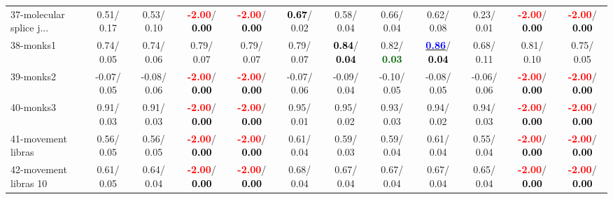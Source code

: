 \begin{table}[h]
\begin{center}
{\begin{tabular}{lc|c|c|c|c|c|c|c|c|c|c}
37-molecular splice j... &   0.51/  0.17 &   0.53/  0.10 & \textcolor{red}{\textbf{ -2.00}}/\textcolor{black}{\textbf{  0.00}} & \textcolor{red}{\textbf{ -2.00}}/\textcolor{black}{\textbf{  0.00}} & \textcolor{black}{\textbf{  0.67}}/  0.02 &   0.58/  0.04 &   0.66/  0.04 &   0.62/  0.08 &   0.23/  0.01 & \textcolor{red}{\textbf{ -2.00}}/\textcolor{black}{\textbf{  0.00}} & \textcolor{red}{\textbf{ -2.00}}/\textcolor{black}{\textbf{  0.00}} \\
38-monks1 &   0.74/  0.05 &   0.74/  0.06 &   0.79/  0.07 &   0.79/  0.07 &   0.79/  0.07 & \textcolor{black}{\textbf{  0.84}}/\textcolor{black}{\textbf{  0.04}} &   0.82/\textcolor{darkgreen}{\textbf{  0.03}} & \underline{\textcolor{blue}{\textbf{  0.86}}}/\textcolor{black}{\textbf{  0.04}} &   0.68/  0.11 &   0.81/  0.10 &   0.75/  0.05 \\
39-monks2 &  -0.07/  0.05 &  -0.08/  0.06 & \textcolor{red}{\textbf{ -2.00}}/\textcolor{black}{\textbf{  0.00}} & \textcolor{red}{\textbf{ -2.00}}/\textcolor{black}{\textbf{  0.00}} &  -0.07/  0.06 &  -0.09/  0.04 &  -0.10/  0.05 &  -0.08/  0.05 &  -0.06/  0.06 & \textcolor{red}{\textbf{ -2.00}}/\textcolor{black}{\textbf{  0.00}} & \textcolor{red}{\textbf{ -2.00}}/\textcolor{black}{\textbf{  0.00}} \\ \hline
40-monks3 &   0.91/  0.03 &   0.91/  0.03 & \textcolor{red}{\textbf{ -2.00}}/\textcolor{black}{\textbf{  0.00}} & \textcolor{red}{\textbf{ -2.00}}/\textcolor{black}{\textbf{  0.00}} &   0.95/  0.01 &   0.95/  0.02 &   0.93/  0.03 &   0.94/  0.02 &   0.94/  0.03 & \textcolor{red}{\textbf{ -2.00}}/\textcolor{black}{\textbf{  0.00}} & \textcolor{red}{\textbf{ -2.00}}/\textcolor{black}{\textbf{  0.00}} \\
41-movement libras &   0.56/  0.05 &   0.56/  0.05 & \textcolor{red}{\textbf{ -2.00}}/\textcolor{black}{\textbf{  0.00}} & \textcolor{red}{\textbf{ -2.00}}/\textcolor{black}{\textbf{  0.00}} &   0.61/  0.04 &   0.59/  0.03 &   0.59/  0.04 &   0.61/  0.04 &   0.55/  0.04 & \textcolor{red}{\textbf{ -2.00}}/\textcolor{black}{\textbf{  0.00}} & \textcolor{red}{\textbf{ -2.00}}/\textcolor{black}{\textbf{  0.00}} \\
42-movement libras 10 &   0.61/  0.05 &   0.64/  0.04 & \textcolor{red}{\textbf{ -2.00}}/\textcolor{black}{\textbf{  0.00}} & \textcolor{red}{\textbf{ -2.00}}/\textcolor{black}{\textbf{  0.00}} &   0.68/  0.04 &   0.67/  0.04 &   0.67/  0.04 &   0.67/  0.04 &   0.65/  0.04 & \textcolor{red}{\textbf{ -2.00}}/\textcolor{black}{\textbf{  0.00}} & \textcolor{red}{\textbf{ -2.00}}/\textcolor{black}{\textbf{  0.00}} \\

\end{tabular}}
\end{center}
\end{table}
